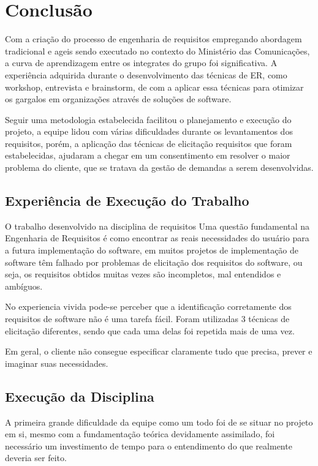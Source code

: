 \chapter[Conclusão]{Conclusão}

Com a criação do processo de engenharia de requisitos empregando abordagem tradicional e ageis
sendo executado no contexto do Ministério das Comunicações, a curva
de aprendizagem entre os integrates do grupo foi significativa. A experiência adquirida durante
o desenvolvimento das técnicas de ER, como workshop, entrevista e brainstorm, de com a aplicar
essa técnicas para otimizar os gargalos em organizações através de soluções de software.

Seguir uma metodologia  estabelecida facilitou o planejamento e execução do projeto,
a equipe lidou com várias dificuldades durante os levantamentos dos requisitos, porém,
a aplicação das técnicas de elicitação requisitos que foram estabelecidas, ajudaram a chegar
em um consentimento em resolver o maior problema do cliente, que se tratava da gestão de demandas
a serem desenvolvidas.

\section{Experiência de Execução do Trabalho}

O trabalho desenvolvido na disciplina de requisitos 
Uma questão fundamental na Engenharia de Requisitos é como encontrar as reais necessidades do usuário para a futura implementação do software, em muitos projetos de implementação de software têm falhado por problemas de elicitação dos requisitos do software, ou seja, os requisitos obtidos muitas vezes são incompletos, mal entendidos e ambíguos. 

No experiencia vivida pode-se perceber que a  identificação corretamente dos requisitos de software não é uma tarefa fácil. Foram utilizadas 3 técnicas de elicitação diferentes, sendo que cada uma delas foi repetida mais de uma vez.

Em geral, o cliente não consegue especificar claramente tudo que precisa, prever e imaginar suas necessidades.

\section{Execução da Disciplina}

A primeira grande dificuldade da equipe como um todo foi de se situar no projeto em si,
mesmo com a fundamentação teórica devidamente assimilado, foi necessário um investimento
de tempo para o entendimento do que realmente deveria ser feito.

